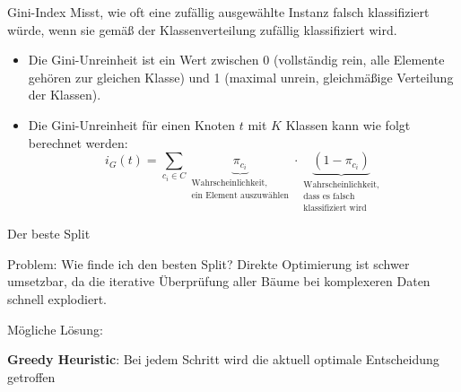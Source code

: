 \documentclass{beamer}
\begin{document}
\begin{frame}{Gini-Index}
	Misst, wie oft eine zufällig ausgewählte Instanz falsch klassifiziert würde, wenn sie gemäß der Klassenverteilung zufällig klassifiziert wird.
	
	\begin{itemize}
		\item Die Gini-Unreinheit ist ein Wert zwischen 0 (vollständig rein, alle Elemente gehören zur gleichen Klasse) und 1 (maximal unrein, gleichmäßige Verteilung der Klassen).
		\item Die Gini-Unreinheit für einen Knoten $t$ mit $K$ Klassen kann wie folgt berechnet werden:
		\[
		i_G (t) = \sum_{c_i \in C} \underbrace{\pi_{c_i}}_{\substack{\text{Wahrscheinlichkeit,} \\ \text{ein Element auszuwählen}}} \cdot \underbrace{(1 - \pi_{c_i})}_{\substack{\text{Wahrscheinlichkeit,} \\ \text{dass es falsch} \\ \text{klassifiziert wird}}}
		\]
	\end{itemize}
	\end{frame}
	
\begin{frame}{Der beste Split}
	\begin{alertblock}{Problem: Wie finde ich den besten Split?}
		Direkte Optimierung ist schwer umsetzbar, da die iterative Überprüfung aller Bäume bei komplexeren Daten schnell explodiert.
		\\\vspace{0.5cm}
		
		
		Mögliche Lösung:\\ \vspace{0.5cm}
		
		
		\textbf{Greedy Heuristic}: Bei jedem Schritt wird die aktuell optimale Entscheidung getroffen
	
	\end{alertblock}
	
	\end{frame}
	
\end{document}

